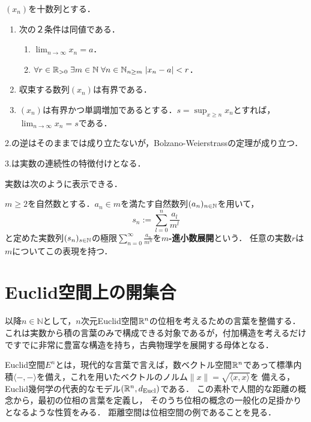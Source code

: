 \documentclass[uplatex,dvipdfmx]{jsreport}
\begin{document}
\begin{proposition}$(x_n)$を十数列とする．
    \begin{enumerate}
        \item 次の２条件は同値である．
        \begin{enumerate}[(1)]
            \item $\lim_{n\to\infty}x_n=a$．
            \item $\forall r\in\mathbb{R}_{>0}\; \exists m\in\mathbb{N} \; \forall n\in\mathbb{N}_{n\ge m} \; |x_n-a|<r$．
        \end{enumerate}
        \item 収束する数列$(x_n)$は有界である．
        \item  $(x_n)$は有界かつ単調増加であるとする．$s=\sup_{x\ge n}x_n$とすれば，$\lim_{n\to\infty}x_n=s$である．
    \end{enumerate}
\end{proposition}
\begin{remark}
    2.の逆はそのままでは成り立たないが，Bolzano-Weierstrassの定理が成り立つ．

    3.は実数の連続性の特徴付けとなる．
\end{remark}

実数は次のように表示できる．
\begin{definition}
    $m\ge 2$を自然数とする．$a_n\in m$を満たす自然数列$(a_n)_{n\in\mathbb{N}}$を用いて，
    \[ s_n:=\sum^n_{l=0}\frac{a_l}{m^l} \]
    と定めた実数列$(s_n)_{s\in\mathbb{N}}$の極限$\sum^\infty_{n=0}\frac{a_n}{m^n}$を\textbf{$m$-進小数展開}という．
    任意の実数$r$は$m$についてこの表現を持つ．
\end{definition}

\section{Euclid空間上の開集合}

\begin{screen}
    以降$n\in\mathbb{N}$として，$n$次元Euclid空間$\mathbb{R}^n$の位相を考えるための言葉を整備する．
    これは実数から積の言葉のみで構成できる対象であるが，付加構造を考えるだけですでに非常に豊富な構造を持ち，古典物理学を展開する母体となる．

    Euclid空間$E^n$とは，現代的な言葉で言えば，数ベクトル空間$\mathbb{R}^n$であって標準内積$\langle -,-\rangle$を備え，これを用いたベクトルのノルム$\|x\|=\sqrt{\langle x,x\rangle}$を
    備える，Euclid幾何学の代表的なモデル$(\mathbb{R}^n,d_{\mathrm{Eucl}})$である．
    この素朴で人間的な距離の概念から，最初の位相の言葉を定義し，
    そのうち位相の概念の一般化の足掛かりとなるような性質をみる．
    距離空間は位相空間の例であることを見る．
\end{screen}
\end{document}
